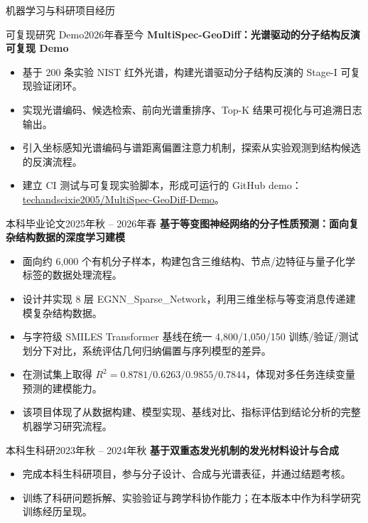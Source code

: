 \documentclass[]{mcdowellcv}
\begin{document}
\begin{cvsection}{机器学习与科研项目经历}
    \begin{cvsubsection}{可复现研究 Demo}{}{2026年春至今}
        \textbf{MultiSpec-GeoDiff：光谱驱动的分子结构反演可复现 Demo}
        \begin{itemize}
            \item 基于 200 条实验 NIST 红外光谱，构建光谱驱动分子结构反演的 Stage-I 可复现验证闭环。
            \item 实现光谱编码、候选检索、前向光谱重排序、Top-K 结果可视化与可追溯日志输出。
            \item 引入坐标感知光谱编码与谱距离偏置注意力机制，探索从实验观测到结构候选的反演流程。
            \item 建立 CI 测试与可复现实验脚本，形成可运行的 GitHub demo：\href{https://github.com/techandscixie2005/MultiSpec-GeoDiff-Demo}{techandscixie2005/MultiSpec-GeoDiff-Demo}。
        \end{itemize}
    \end{cvsubsection}

    \begin{cvsubsection}{本科毕业论文}{}{2025年秋 -- 2026年春}
        \textbf{基于等变图神经网络的分子性质预测：面向复杂结构数据的深度学习建模}
        \begin{itemize}
            \item 面向约 6,000 个有机分子样本，构建包含三维结构、节点/边特征与量子化学标签的数据处理流程。
            \item 设计并实现 8 层 EGNN\_Sparse\_Network，利用三维坐标与等变消息传递建模复杂结构数据。
            \item 与字符级 SMILES Transformer 基线在统一 4,800/1,050/150 训练/验证/测试划分下对比，系统评估几何归纳偏置与序列模型的差异。
            \item 在测试集上取得 $R^2 = 0.8781 / 0.6263 / 0.9855 / 0.7844$，体现对多任务连续变量预测的建模能力。
            \item 该项目体现了从数据构建、模型实现、基线对比、指标评估到结论分析的完整机器学习研究流程。
        \end{itemize}
    \end{cvsubsection}

    \begin{cvsubsection}{本科生科研}{}{2023年秋 -- 2024年秋}
        \textbf{基于双重态发光机制的发光材料设计与合成}
        \begin{itemize}
            \item 完成本科生科研项目，参与分子设计、合成与光谱表征，并通过结题考核。
            \item 训练了科研问题拆解、实验验证与跨学科协作能力；在本版本中作为科学研究训练经历呈现。
        \end{itemize}
    \end{cvsubsection}
\end{cvsection}
\end{document}
